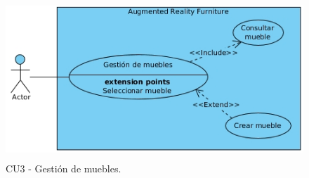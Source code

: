 \begin{figure}[h!]
	\centering
	\includegraphics[width=12cm,height=6cm]{imagenes/analisis/seleccionarMueble.jpg}
	\caption{CU3 - Gestión de muebles.}
	\label{fig:analogo}
\end{figure}

